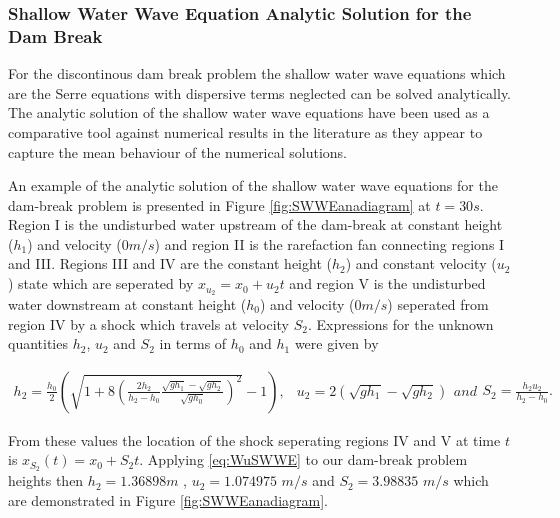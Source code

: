 \documentclass[times]{elsarticle}
\begin{document}
\subsubsection{Shallow Water Wave Equation Analytic Solution for the Dam Break}
For the discontinous dam break problem the shallow water wave equations which are the Serre equations with dispersive terms neglected can be solved analytically. The analytic solution of the shallow water wave equations have been used as a comparative tool against numerical results in the literature \cite{Hank-etal-2010-2034,Mitsotakis-etal-2014} as they appear to capture the mean behaviour of the numerical solutions. 

An example of the analytic solution of the shallow water wave equations for the dam-break problem is presented in Figure \ref{fig:SWWEanadiagram} at $t=30s$. Region I is the undisturbed water upstream of the dam-break at constant height ($h_1$) and velocity ($0m/s$) and region II is the rarefaction fan connecting regions I and III. Regions III and IV are the constant height ($h_2$) and constant velocity ($u_2$) state which are seperated by $x_{u_2} = x_0 + u_2t$ and region V is the undisturbed water downstream at constant height ($h_0$) and velocity ($0m/s$) seperated from region IV by a shock which travels at velocity $S_2$. Expressions for the unknown quantities $h_2$, $u_2$ and $S_2$ in terms of $h_0$ and $h_1$ were given by \citet{Wu-etal-1999-1210}
\begin{linenomath*}
\begin{subequations}
\begin{gather}
h_2 = \frac{h_0}{2} \left(\sqrt{1 + 8 \left(\frac{2h_2}{h_2 - h_0}\frac{\sqrt{gh_1} - \sqrt{gh_2}}{\sqrt{gh_0}}\right)^2} - 1\right),
\end{gather}
	\begin{gather}
	u_2 = 2\left(\sqrt{gh_1} - \sqrt{gh_2}\right)
	\end{gather}
and
	\begin{gather}
	S_2 = \frac{h_2 u_2}{h_2 - h_0}.
	\end{gather}
\label{eq:WuSWWE}	
\end{subequations}
\end{linenomath*}
From these values the location of the shock seperating regions IV and V at time $t$ is $x_{S_2}(t) = x_0 + S_2t$. Applying \eqref{eq:WuSWWE} to our dam-break problem heights then $h_2 = 1.36898m$ , $u_2 = 1.074975$ $m/s$ and $S_2 = 3.98835$ $m/s$ which are demonstrated in Figure \ref{fig:SWWEanadiagram}.
\end{document}
